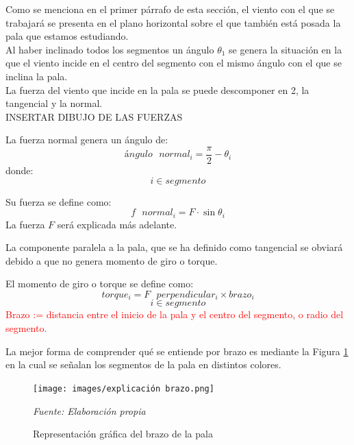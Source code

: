 Como se menciona en el primer párrafo de esta sección, el viento con el que se trabajará se presenta en el plano horizontal sobre el que también está posada la pala que estamos estudiando.\\

Al haber inclinado todos los segmentos un ángulo $ \theta_1 $ se genera la situación en la que el viento incide en el centro del segmento con el mismo ángulo con el que se inclina la pala. \\

La fuerza del viento que incide en la pala se puede descomponer en 2, la tangencial y la normal. \\

 INSERTAR DIBUJO DE LAS FUERZAS \\
 
 \begin{definicion}
 La fuerza normal genera un ángulo de:
 $$ ángulo \text{ } normal_i = \dfrac{\pi}{2} - \theta_i $$
 donde:
 $$ i \in segmento$$
 \end{definicion}

 \begin{definicion}
  Su fuerza se define como:
  $$ f \text{ } normal_i = F \cdot \sin{\theta_i}$$
   La fuerza $F$ será explicada más adelante.
  \label{def:fuerza_normal}
 \end{definicion}

 
 La componente paralela a la pala, que se ha definido como tangencial se obviará debido a que no genera momento de giro o torque. 
 
 \begin{definicion}
El momento de giro o torque se define como:
 $$ torque_i = F \text{ } perpendicular_i \times brazo_i$$
 $$ i \in segmento$$
 \label{def:torque} %
 \textcolor{red}{Brazo := distancia entre el inicio de la pala y el centro del segmento, o radio del segmento.} \\
 \end{definicion}

 La mejor forma de comprender qué se entiende por brazo es mediante la Figura \ref{fig:exp_brazo} en la cual se señalan los segmentos de la pala en distintos colores.
 
     \textbf{}
    \begin{figure}[H]
    \centering
    \texttt{[image: images/explicación brazo.png]}
    \caption{Representación gráfica del brazo de la pala}
    \label{fig:exp_brazo}
    \textit{Fuente: Elaboración propia}
\end{figure}

